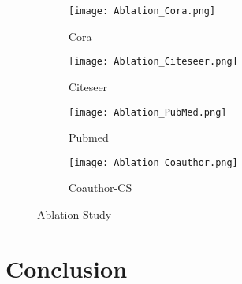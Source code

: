 \documentclass[lettersize,journal]{IEEEtran}
\theoremstyle{plain}
\theoremstyle{definition}
\theoremstyle{remark}
\begin{document}
\begin{figure}[ht]
	\begin{subfigure}[b]{0.207\textwidth}
		\begin{center}
			\texttt{[image: Ablation\_Cora.png]}
			\caption{Cora}
			\label{fig:ablation:cora}
		\end{center}
	\end{subfigure}
	\hfill
	\begin{subfigure}[b]{0.269\textwidth}
		\begin{center}
			\texttt{[image: Ablation\_Citeseer.png]}
			\caption{Citeseer}
			\label{fig:ablation:citeseer}
		\end{center}
	\end{subfigure}
	\newline
	\begin{subfigure}[b]{0.21\textwidth}
		\begin{center}
			\texttt{[image: Ablation\_PubMed.png]}
			\caption{Pubmed}
			\label{fig:ablation:pubmed}
		\end{center}
	\end{subfigure}
	\hfill
	\begin{subfigure}[b]{0.265\textwidth}
		\begin{center}
			\texttt{[image: Ablation\_Coauthor.png]}
			\caption{Coauthor-CS}
			\label{fig:ablation:coauthor}
		\end{center}
	\end{subfigure}
	\caption{Ablation Study}
	\label{fig:ablation}
\end{figure}

\section{Conclusion}
\label{conclusion}
\end{document}
